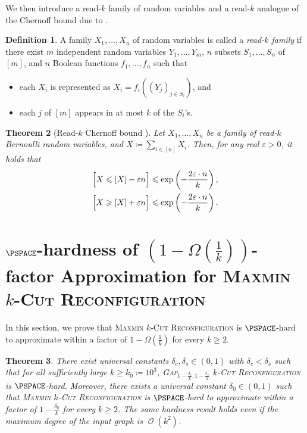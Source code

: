 \documentclass[11pt,fleqn]{article}
\renewcommand{\geq}{\geqslant}
\renewcommand{\leq}{\leqslant}
\renewcommand{\epsilon}{\varepsilon}
\newcommand{\prb}[1]{\textsc{#1}\xspace}
\newcommand{\defeq}{\coloneq}
\let\E\relax\DeclareMathOperator*{\E}{\mathbb{E}}  \let\Pr\relax\DeclareMathOperator*{\Pr}{\mathbb{Pr}}
\DeclareMathOperator{\bigO}{\mathcal{O}}
\newcommand{\kzero}{10^3}
\newcommand{\kCutReconf}{\prb{$k$-Cut Reconfiguration}}
\newcommand{\MMkCutReconf}{\prb{Maxmin $k$-Cut Reconfiguration}}
\let\Pr\relax\DeclareMathOperator*{\Pr}{\mathbb{P}}
\newtheorem{theorem}{Theorem}[section]
\theoremstyle{definition}
\newtheorem{definition}[theorem]{Definition}
\numberwithin{equation}{section}
\begin{document}
We then introduce a read-$k$ family of random variables and
a read-$k$ analogue of the Chernoff bound due to \citet{gavinsky2015tail}.


\begin{definition}
    A family $X_1, \ldots, X_n$ of random variables is called
    a \emph{read-$k$ family}
    if there exist
    $m$ independent random variables $Y_1, \ldots, Y_m$,
    $n$ subsets $S_1, \ldots, S_n$ of $[m]$, and
    $n$ Boolean functions $f_1, \ldots, f_n$ such that
    \begin{itemize}
    \item each $X_i$ is represented as $X_i = f_i((Y_j)_{j \in S_i})$, and
    \item each $j$ of $[m]$ appears in at most $k$ of the $S_i$'s.
    \end{itemize}
\end{definition}


\begin{theorem}[Read-$k$ Chernoff bound \cite{gavinsky2015tail}]
\label{thm:read-k-Chernoff}
    Let $X_1, \ldots, X_n$ be a family of read-$k$ Bernoulli random variables, and
    $X \defeq \sum_{i \in [n]} X_i$.
    Then, for any real $\epsilon > 0$, it holds that
    \begin{align}
    \begin{aligned}
        \Pr\Bigl[ X \leq \E[X] - \epsilon n \Bigr]
        & \leq \exp\left(
            -\frac{2\epsilon \cdot n}{k}
        \right), \\
        \Pr\Bigl[ X \geq \E[X] + \epsilon n \Bigr]
        & \leq \exp\left(
            -\frac{2\epsilon \cdot n}{k}
        \right).
    \end{aligned}
    \end{align}
\end{theorem}
 \section{$\PSPACE$-hardness of $\left(1-\Omega\left(\frac{1}{k}\right)\right)$-factor Approximation for \MMkCutReconf}
\label{sec:Cut-hard}


In this section, we prove that \MMkCutReconf is $\PSPACE$-hard to approximate
within a factor of $1 - \Omega\left(\frac{1}{k}\right)$ for every $k \geq 2$.


\begin{theorem}
\label{thm:Cut-hard}
    There exist universal constants $\delta_c,\delta_s \in (0,1)$ with $\delta_c < \delta_s$ such that
    for all sufficiently large $k \geq k_0 \defeq \kzero$,
    \prb{Gap$_{1-\frac{\delta_c}{k}, 1-\frac{\delta_s}{k}}$ \kCutReconf} is $\PSPACE$-hard.
    Moreover,
    there exists a universal constant $\delta_0 \in (0,1)$ such that
    \MMkCutReconf is
    $\PSPACE$-hard to approximate within a factor of $1 - \frac{\delta_0}{k}$
    for every $k \geq 2$.
    The same hardness result holds even if
    the maximum degree of the input graph is $\bigO(k^2)$.
\end{theorem}
\end{document}
